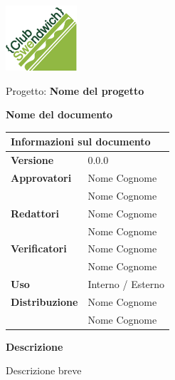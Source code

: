 \documentclass{article}
\newcommand{\docname}{Nome del documento}
\newcommand{\docprojectname}{Nome del progetto}
\newcommand{\docversion}{0.0.0}
\newcommand{\docusage}{Interno / Esterno}
\newcommand{\docdescription}{Descrizione breve}
\newcommand{\doceditors}{Nome Cognome \\& Nome Cognome}
\newcommand{\docverifiers}{Nome Cognome \\& Nome Cognome}
\newcommand{\docapprovers}{Nome Cognome \\& Nome Cognome}
\newcommand{\docdistribution}{Nome Cognome \\& Nome Cognome}
\begin{document}
\begin{center}
\includegraphics{ClubSweLogo}

Progetto: \textbf{\docprojectname}

\textcolor{orgcolorlight}{\Huge\textbf{\docname}}

\begin{table}[H]
    \centering
    \begin{tabular}{l|l}
    \multicolumn{2}{l}{\textbf{Informazioni sul documento}}  \\
    \hline
    \textbf{Versione}      & \docversion                     \\
    \textbf{Approvatori}   & \docapprovers                   \\
    \textbf{Redattori}     & \doceditors                     \\
    \textbf{Verificatori}  & \docverifiers                   \\
    \textbf{Uso}           & \docusage                       \\
    \textbf{Distribuzione} & \docdistribution
    \end{tabular}
\end{table}

\textbf{Descrizione}

\docdescription


\end{center}

\newpage

\end{document}
